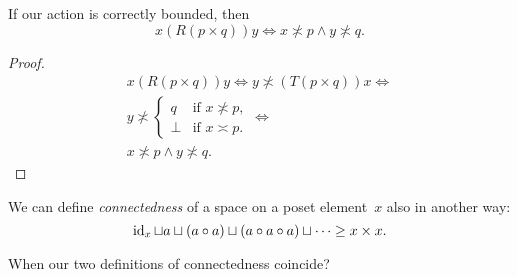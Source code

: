 % 
% 

\begin{thm}
If our action is correctly bounded, then
\[ x(R(p\times q))y\Leftrightarrow x\nasymp p\land y\nasymp q. \]
\end{thm}

\begin{proof}
\begin{multline*}
x(R(p\times q))y \Leftrightarrow
y\nasymp(T(p\times q))x \Leftrightarrow \\
y\nasymp
\left\{\begin{array}{ll}q&\text{if }x\nasymp p,\\\bot&\text{if }x\asymp p.\end{array}\right. \Leftrightarrow \\
x\nasymp p\land y\nasymp q.
\end{multline*}
\end{proof}

% 

\begin{defn}
We can define \emph{connectedness} of a space on a poset element~$x$ also in another way:
\[ \operatorname{id}_x\sqcup a\sqcup(a\circ a)\sqcup(a\circ a\circ a)\sqcup\dots \geq x\times x. \]
\end{defn}

\begin{problem}
When our two definitions of connectedness coincide?
\end{problem}

